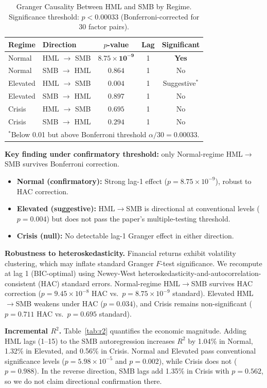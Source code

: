 \documentclass{uai2026}
\begin{document}
\begin{table}[t]
\centering
\caption{Granger Causality Between HML and SMB by Regime. Significance threshold:
$p < 0.00033$ (Bonferroni-corrected for 30 factor pairs).}
\label{tab:main}
\small
\begin{tabular}{llccc}
\toprule
Regime & Direction & $p$-value & Lag & Significant \\
\midrule
Normal & HML $\to$ SMB & $\mathbf{8.75 \times 10^{-9}}$ & 1 & \textbf{Yes} \\
Normal & SMB $\to$ HML & $0.864$ & 1 & No \\
\midrule
Elevated & HML $\to$ SMB & $0.004$ & 1 & Suggestive$^*$ \\
Elevated & SMB $\to$ HML & $0.897$ & 1 & No \\
\midrule
Crisis & HML $\to$ SMB & $0.695$ & 1 & No \\
Crisis & SMB $\to$ HML & $0.294$ & 1 & No \\
\bottomrule
\multicolumn{5}{l}{\footnotesize $^*$Below 0.01 but above Bonferroni threshold $\alpha/30 = 0.00033$.}
\end{tabular}
\end{table}

\textbf{Key finding under confirmatory threshold:} only Normal-regime
HML$\to$SMB survives Bonferroni correction.
\begin{itemize}
    \item \textbf{Normal (confirmatory):} Strong lag-1 effect
    ($p = 8.75 \times 10^{-9}$), robust to HAC correction.
    \item \textbf{Elevated (suggestive):} HML$\to$SMB is directional at
    conventional levels ($p = 0.004$) but does not pass the paper's
    multiple-testing threshold.
    \item \textbf{Crisis (null):} No detectable lag-1 Granger effect in either
    direction.
\end{itemize}

\textbf{Robustness to heteroskedasticity.}
Financial returns exhibit volatility clustering, which may inflate standard Granger
$F$-test significance. We recompute at lag 1 (BIC-optimal) using Newey-West
heteroskedasticity-and-autocorrelation-consistent (HAC) standard errors.
Normal-regime HML$\to$SMB survives HAC correction
($p = 9.45 \times 10^{-8}$ HAC vs.\ $p = 8.75 \times 10^{-9}$ standard).
Elevated HML$\to$SMB weakens under HAC ($p = 0.034$), and Crisis remains
non-significant ($p = 0.711$ HAC vs.\ $p = 0.695$ standard).

\textbf{Incremental $R^2$.} Table~\ref{tab:r2} quantifies the economic magnitude. Adding
HML lags (1--15) to the SMB autoregression increases $R^2$ by 1.04\% in Normal,
1.32\% in Elevated, and 0.56\% in Crisis. Normal and Elevated pass conventional
significance levels ($p = 5.98 \times 10^{-5}$ and $p = 0.002$), while Crisis
does not ($p = 0.988$). In the reverse direction, SMB lags add 1.35\% in Crisis
with $p = 0.562$, so we do not claim directional confirmation there.
\end{document}
